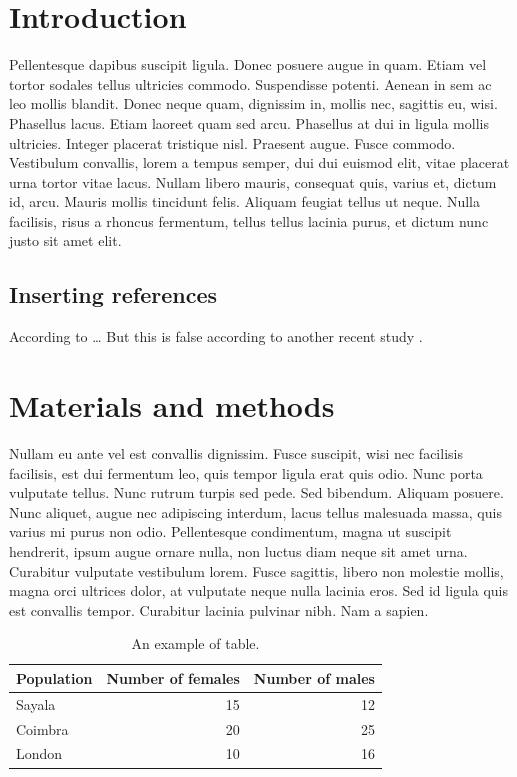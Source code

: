 \documentclass[APA,LATO1COL]{WileyNJD-v2}
\begin{document}

\section{Introduction}
\label{sec:orgca680ac}
Pellentesque dapibus suscipit ligula.  Donec posuere augue in quam.  Etiam vel tortor sodales tellus ultricies commodo.  Suspendisse potenti.  Aenean in sem ac leo mollis blandit.  Donec neque quam, dignissim in, mollis nec, sagittis eu, wisi.  Phasellus lacus.  Etiam laoreet quam sed arcu.  Phasellus at dui in ligula mollis ultricies.  Integer placerat tristique nisl.  Praesent augue.  Fusce commodo.  Vestibulum convallis, lorem a tempus semper, dui dui euismod elit, vitae placerat urna tortor vitae lacus.  Nullam libero mauris, consequat quis, varius et, dictum id, arcu.  Mauris mollis tincidunt felis.  Aliquam feugiat tellus ut neque.  Nulla facilisis, risus a rhoncus fermentum, tellus tellus lacinia purus, et dictum nunc justo sit amet elit.

\subsection{Inserting references}
\label{sec:org126491d}
According to \cite{adams2019_PhylogeneticComparativeMethods}\ldots{} But this is false according to another recent study \citep{aczel2020_DiscussionPointsBayesian}.

\section{Materials and methods}
\label{sec:org844f145}
Nullam eu ante vel est convallis dignissim.  Fusce suscipit, wisi nec facilisis facilisis, est dui fermentum leo, quis tempor ligula erat quis odio.  Nunc porta vulputate tellus.  Nunc rutrum turpis sed pede.  Sed bibendum.  Aliquam posuere.  Nunc aliquet, augue nec adipiscing interdum, lacus tellus malesuada massa, quis varius mi purus non odio.  Pellentesque condimentum, magna ut suscipit hendrerit, ipsum augue ornare nulla, non luctus diam neque sit amet urna.  Curabitur vulputate vestibulum lorem.  Fusce sagittis, libero non molestie mollis, magna orci ultrices dolor, at vulputate neque nulla lacinia eros.  Sed id ligula quis est convallis tempor.  Curabitur lacinia pulvinar nibh.  Nam a sapien.

\begin{table}[htbp]
\centering
\begin{tabular}{lrr}
\hline
Population & Number of females & Number of males\\
\hline
Sayala & 15 & 12\\
Coimbra & 20 & 25\\
London & 10 & 16\\
\hline
\end{tabular}
\caption{An example of table.}

\end{table}
\end{document}
